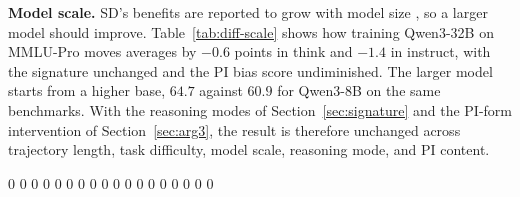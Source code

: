 \documentclass{article}
\makeatletter
\newcommand{\sdgreset}[1]{%
  \expandafter\gdef\csname sdB@#1\endcsname{0}%
  \expandafter\gdef\csname sdS@#1\endcsname{0}%
  \expandafter\gdef\csname sdN@#1\endcsname{0}}
\makeatother
\begin{document}
\textbf{Model scale.}
\label{sec:size}
SD's benefits are reported to grow with model size \citep{sdpo2025}, so a larger model should improve. Table~\ref{tab:diff-scale} shows how training Qwen3-32B on MMLU-Pro moves averages by $-0.6$ points in think and $-1.4$ in instruct, with the signature unchanged and the PI bias score undiminished. The larger model starts from a higher base, $64.7$ against $60.9$ for Qwen3-8B on the same benchmarks. With the reasoning modes of Section~\ref{sec:signature} and the PI-form intervention of Section~\ref{sec:arg3}, the result is therefore unchanged across trajectory length, task difficulty, model scale, reasoning mode, and PI content.

\begin{table}[tb]
\centering
\caption{\textbf{Robustness to task difficulty and model scale.}
Easy/medium/hard subsets of MMLU-Pro (left) and Qwen3-32B on full MMLU-Pro (right); Qwen3-8B think unless noted.
``SD'' and $\Delta=\text{SD}-\text{Base}$ follow Table~\ref{tab:main}, \textcolor{chgpos}{green} positive and \textcolor{chgneg}{red} negative; base scores are omitted for space and recoverable as $\text{SD}-\Delta$.}
\footnotesize
\renewcommand{\arraystretch}{1.0}
{\setlength{\tabcolsep}{2.4pt}\sdgreset{difbase}\sdgreset{difE}\sdgreset{difM}\sdgreset{difH}\sdgreset{sizeT}\sdgreset{sizeI}%
}
\end{table}
\end{document}
